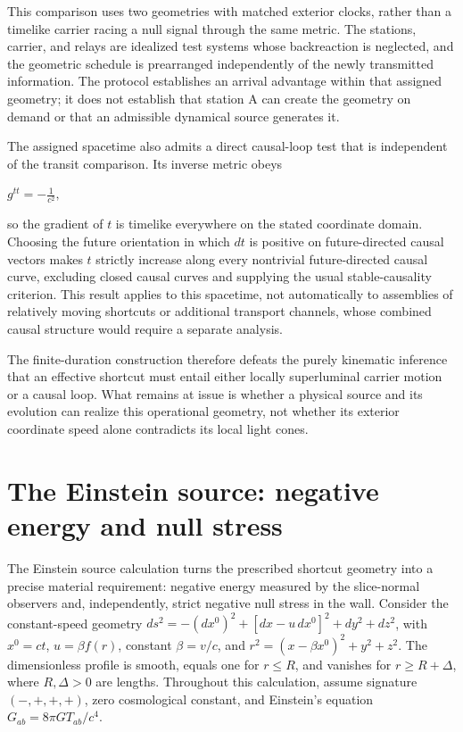 \documentclass[11pt]{article}
\begin{document}
This comparison uses two geometries with matched exterior clocks, rather than a timelike carrier racing a null signal through the same metric. The stations, carrier, and relays are idealized test systems whose backreaction is neglected, and the geometric schedule is prearranged independently of the newly transmitted information. The protocol establishes an arrival advantage within that assigned geometry; it does not establish that station A can create the geometry on demand or that an admissible dynamical source generates it.

The assigned spacetime also admits a direct causal-loop test that is independent of the transit comparison. Its inverse metric obeys

$g^{tt}=-\frac{1}{c^2},$

so the gradient of $t$ is timelike everywhere on the stated coordinate domain. Choosing the future orientation in which $dt$ is positive on future-directed causal vectors makes $t$ strictly increase along every nontrivial future-directed causal curve, excluding closed causal curves and supplying the usual stable-causality criterion. This result applies to this spacetime, not automatically to assemblies of relatively moving shortcuts or additional transport channels, whose combined causal structure would require a separate analysis.

The finite-duration construction therefore defeats the purely kinematic inference that an effective shortcut must entail either locally superluminal carrier motion or a causal loop. What remains at issue is whether a physical source and its evolution can realize this operational geometry, not whether its exterior coordinate speed alone contradicts its local light cones.

\section{The Einstein source: negative energy and null stress}
The Einstein source calculation turns the prescribed shortcut geometry into a precise material requirement: negative energy measured by the slice-normal observers and, independently, strict negative null stress in the wall. Consider the constant-speed geometry $ds^2=-(dx^0)^2+[dx-u\,dx^0]^2+dy^2+dz^2$, with $x^0=ct$, $u=\beta f(r)$, constant $\beta=v/c$, and $r^2=(x-\beta x^0)^2+y^2+z^2$. The dimensionless profile is smooth, equals one for $r\leq R$, and vanishes for $r\geq R+\Delta$, where $R,\Delta>0$ are lengths. Throughout this calculation, assume signature $(-,+,+,+)$, zero cosmological constant, and Einstein\textquoteright{}s equation $G_{ab}=8\pi G T_{ab}/c^4$.
\end{document}
